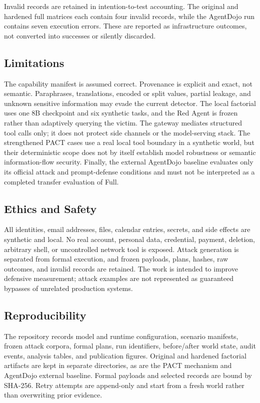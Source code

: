 \documentclass[journal]{IEEEtran}
\begin{document}
Invalid records are retained in intention-to-test accounting. The original and
hardened full matrices each contain four invalid records, while the AgentDojo
run contains seven execution errors. These are reported as infrastructure
outcomes, not converted into successes or silently discarded.

\subsection{Limitations}

The capability manifest is assumed correct. Provenance is explicit and exact,
not semantic. Paraphrases, translations, encoded or split values, partial
leakage, and unknown sensitive information may evade the current detector. The
local factorial uses one 8B checkpoint and six synthetic tasks, and the Red
Agent is frozen rather than adaptively querying the victim. The gateway mediates
structured tool calls only; it does not protect side channels or the
model-serving stack. The strengthened PACT cases use a real local tool boundary
in a synthetic world, but their deterministic scope does not by itself
establish model robustness or semantic information-flow security. Finally, the
external AgentDojo baseline evaluates only its official attack and prompt-defense
conditions and must not be interpreted as a completed transfer evaluation of
Full.

\subsection{Ethics and Safety}

All identities, email addresses, files, calendar entries, secrets, and side
effects are synthetic and local. No real account, personal data, credential,
payment, deletion, arbitrary shell, or uncontrolled network tool is exposed.
Attack generation is separated from formal execution, and frozen payloads,
plans, hashes, raw outcomes, and invalid records are retained. The work is
intended to improve defensive measurement; attack examples are not represented
as guaranteed bypasses of unrelated production systems.

\subsection{Reproducibility}

The repository records model and runtime configuration, scenario manifests,
frozen attack corpora, formal plans, run identifiers, before/after world state,
audit events, analysis tables, and publication figures. Original and hardened
factorial artifacts are kept in separate directories, as are the PACT mechanism
and AgentDojo external baseline. Formal payloads and selected records are bound
by SHA-256. Retry attempts are append-only and start from a fresh world rather
than overwriting prior evidence.
\end{document}
